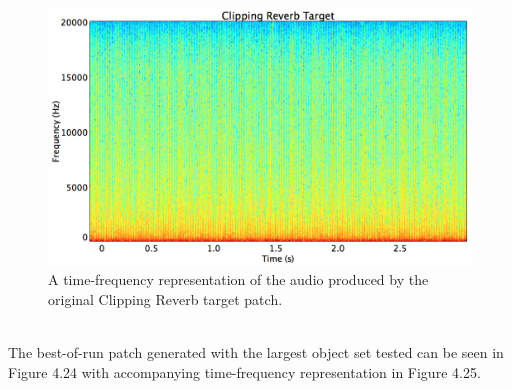 \documentclass[a4paper,12pt]{report} 	%
\numberwithin{figure}{chapter}
\numberwithin{table}{chapter}
\numberwithin{equation}{chapter}
\begin{document}
\begin{flushleft}
\begin{figure}[h!]
\begin{center}
\includegraphics[scale=0.35,width=\linewidth]{ClippingReverbTargetSTFT}
\caption[Original Clipping Reverb Sawtooth Time-Frequency Representation]{A time-frequency representation of the audio produced by the original Clipping Reverb target patch.}
\end{center}
\end{figure}
\\

The best-of-run patch generated with the largest object set tested can be seen in Figure 4.24 with accompanying time-frequency representation in Figure 4.25.


\end{flushleft}
\end{document}
